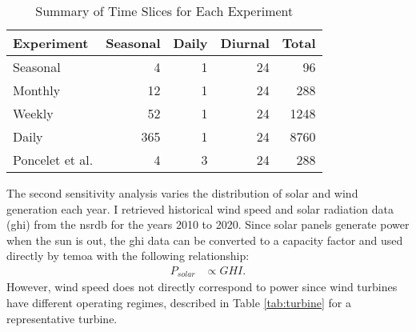 \begin{table}[H]
  \centering
  \caption{Summary of Time Slices for Each Experiment}
  \label{tab:time-slice}
  \begin{tabular}{lrrrr}
    \toprule
    Experiment & Seasonal & Daily & Diurnal & Total\\
    \midrule
    Seasonal & 4 & 1 & 24 & 96\\
    Monthly & 12 & 1 & 24 & 288\\
    Weekly & 52 & 1 & 24 & 1248\\
    Daily & 365 & 1 & 24 & 8760\\
    \midrule
    Poncelet et al. \cite{poncelet_impact_2016} & 4 & 3 &  24 & 288\\
    \bottomrule
  \end{tabular}
\end{table}

The second sensitivity analysis varies the distribution of solar and wind generation
each year. I retrieved historical wind speed and solar radiation data (\gls{ghi})
from the \gls{nsrdb} \cite{sengupta_national_2018} for the years 2010 to 2020.
Since solar panels generate power when the sun is out, the \gls{ghi} data can be
converted to a capacity factor and used directly by \gls{temoa} with the following
relationship:
\begin{align}
  P_{solar} &\propto GHI.
\end{align}
However,
wind speed does not directly correspond to power since wind turbines have different
operating regimes, described in Table \ref{tab:turbine} for a representative turbine.

\begin{table}[H]
  \centering
  \caption{Summary of Wind Turbine Data}
  \label{tab:turbine}

\end{table}

